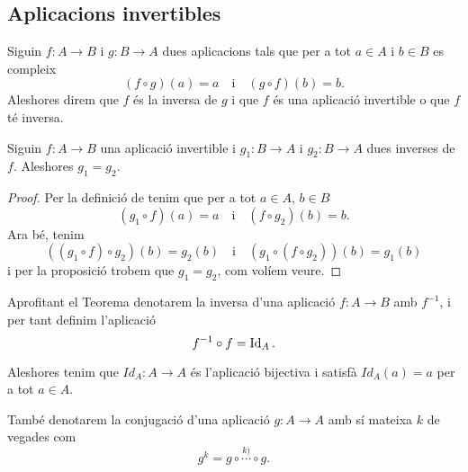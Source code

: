 \documentclass[../Apunts.tex]{subfiles}
\begin{document}
	\subsection{Aplicacions invertibles}
	\begin{definition}
		\label{def:aplicació invertible}
		\label{def:inversa d'una aplicació}
		Siguin \(f\colon A\rightarrow B\) i \(g\colon B\rightarrow A\) dues aplicacions tals que per a tot \(a\in A\) i \(b\in B\) es compleix
		\[(f\circ g)(a)=a\quad\text{i}\quad(g\circ f)(b)=b.\]
		Aleshores direm que \(f\) és la inversa de \(g\) i que \(f\) és una aplicació invertible o que \(f\) té inversa.
	\end{definition}
	\begin{theorem}
		\label{thm:unicitat de les inverses de les aplicacions bijectives}
		Siguin \(f\colon A\rightarrow B\) una aplicació invertible i \(g_{1}\colon B\rightarrow A\) i \(g_{2}\colon B\rightarrow A\) dues inverses de \(f\). Aleshores \(g_{1}=g_{2}\).
		\begin{proof}
			Per la definició de  tenim que per a tot \(a\in A\), \(b\in B\)
			\[(g_{1}\circ f)(a)=a\quad\text{i}\quad(f\circ g_{2})(b)=b.\]
			Ara bé, tenim
			\[((g_{1}\circ f)\circ g_{2})(b)=g_{2}(b)\quad\text{i}\quad(g_{1}\circ(f\circ g_{2}))(b)=g_{1}(b)\]
			i per la proposició  trobem que \(g_{1}=g_{2}\), com volíem veure.
		\end{proof}
	\end{theorem}
	\begin{notation}
		\label{notation:aplicació identitat}
		Aprofitant el Teorema  denotarem la inversa d'una aplicació \(f:A\rightarrow B\) amb \(f^{-1}\), i per tant definim l'aplicació
		\[f^{-1}\circ f=\operatorname{Id}_{A}.\]
		
		Aleshores tenim que \(Id_{A}\colon A\rightarrow A\) és l'aplicació bijectiva i satisfà \(Id_{A}(a)=a\) per a tot \(a\in A\).
		
		També denotarem la conjugació d'una aplicació \(g\colon A\rightarrow A\) amb sí mateixa \(k\) de vegades com \[g^{k}=g\circ\overset{k)}{\cdots}\circ g.\]
	\end{notation}
\end{document}
